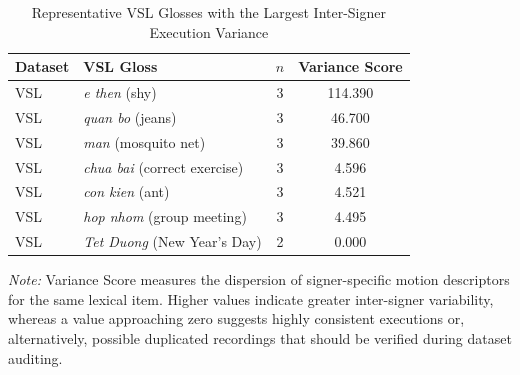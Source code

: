 \documentclass{ieeeaccess}
\DeclareRobustCommand{\textbf}[1]{{\bfseries #1}}
\begin{document}
\begin{table}[!t]
\caption{Representative VSL Glosses with the Largest Inter-Signer Execution Variance}
\label{tab:app_signer}

\centering
\small
\setlength{\tabcolsep}{6pt}

\begin{tabular}{llcc}
\toprule
\textbf{Dataset} &
\textbf{VSL Gloss} &
\textbf{$n$} &
\textbf{Variance Score} \\
\midrule

VSL &
\textit{e then} (shy) &
3 &
114.390 \\

VSL &
\textit{quan bo} (jeans) &
3 &
46.700 \\

VSL &
\textit{man} (mosquito net) &
3 &
39.860 \\

VSL &
\textit{chua bai} (correct exercise) &
3 &
4.596 \\

VSL &
\textit{con kien} (ant) &
3 &
4.521 \\

VSL &
\textit{hop nhom} (group meeting) &
3 &
4.495 \\

VSL &
\textit{Tet Duong} (New Year's Day) &
2 &
0.000 \\

\bottomrule
\end{tabular}

\vspace{2mm}

\footnotesize
\textit{Note:}
Variance Score measures the dispersion of signer-specific motion descriptors for the same lexical item.
Higher values indicate greater inter-signer variability, whereas a value approaching zero suggests highly consistent executions or, alternatively, possible duplicated recordings that should be verified during dataset auditing.

\end{table}
\end{document}
